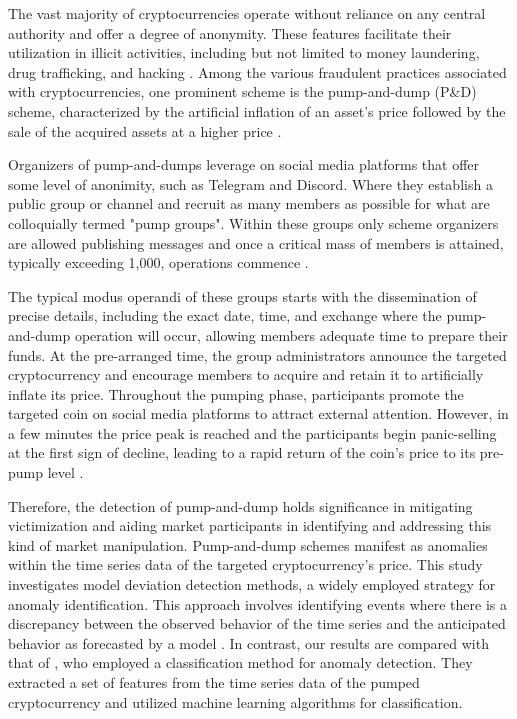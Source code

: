 \documentclass[12pt]{article}
\begin{document}
	The vast majority of cryptocurrencies operate without reliance on any central authority and offer a degree of anonymity.
	These features facilitate their utilization in illicit activities, including but not limited to money laundering, drug trafficking, and hacking \citep{Kethineni2019}.
	Among the various fraudulent practices associated with cryptocurrencies, one prominent scheme is the pump-and-dump (P\&D) scheme, characterized by the artificial inflation of an asset's price followed by the sale of the acquired assets at a higher price \citep{li2021}.

	Organizers of pump-and-dumps leverage on social media platforms that offer some level of anonimity, such as Telegram and Discord.
	Where they establish a public group or channel and recruit as many members as possible for what are colloquially termed "pump groups".
	Within these groups only scheme organizers are allowed publishing messages and once a critical mass of members is attained, typically exceeding 1,000, operations commence \citep{xu2019}.

	The typical modus operandi of these groups starts with the dissemination of precise details, including the exact date, time, and exchange where the pump-and-dump operation will occur, allowing members adequate time to prepare their funds.
	At the pre-arranged time, the group administrators announce the targeted cryptocurrency and encourage members to acquire and retain it to artificially inflate its price.
	Throughout the pumping phase, participants promote the targeted coin on social media platforms to attract external attention.
	However, in a few minutes the price peak is reached and the participants begin panic-selling at the first sign of decline, leading to a rapid return of the coin's price to its pre-pump level \citep{xu2019}.

	Therefore, the detection of pump-and-dump holds significance in mitigating victimization and aiding market participants in identifying and addressing this kind of market manipulation.
	Pump-and-dump schemes manifest as anomalies within the time series data of the targeted cryptocurrency's price.
	This study investigates model deviation detection methods, a widely employed strategy for anomaly identification.
	This approach involves identifying events where there is a discrepancy between the observed behavior of the time series and the anticipated behavior as forecasted by a model \citep{ogasawara2024}.
	In contrast, our results are compared with that of \citet{lamorgia2020}, who employed a classification method for anomaly detection.
	They extracted a set of features from the time series data of the pumped cryptocurrency and utilized machine learning algorithms for classification.
\end{document}
